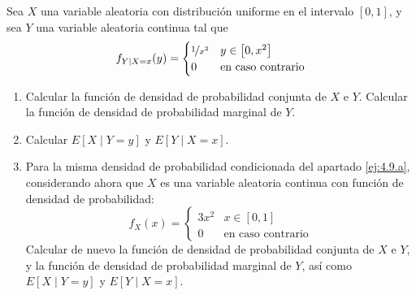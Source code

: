 \begin{ejercicio}
    Sea $X$ una variable aleatoria con distribución uniforme en el intervalo $[0,1]$, y sea $Y$ una variable aleatoria continua tal que
    \begin{equation*}
        f_{Y\mid X=x}(y) = \begin{cases}
            \nicefrac{1}{x^2} & y \in \left[0, x^2\right]\\
            0 & \text{en caso contrario}
        \end{cases}
    \end{equation*}
    \begin{enumerate}
        \item\label{ej:4.9.a} Calcular la función de densidad de probabilidad conjunta de $X$ e $Y$. Calcular la función de densidad de probabilidad marginal de $Y$.
        \item Calcular $E[X\mid Y = y]$ y $E[Y\mid X = x]$.
        \item Para la misma densidad de probabilidad condicionada del apartado \ref{ej:4.9.a}, considerando ahora que $X$ es una variable aleatoria continua con función de densidad de probabilidad:
        \begin{equation*}
            f_X(x) = \begin{cases}
                3x^2 & x \in \left[0,1\right]\\
                0 & \text{en caso contrario}
            \end{cases}
        \end{equation*}
        Calcular de nuevo la función de densidad de probabilidad conjunta de $X$ e $Y$, y la función de densidad de probabilidad marginal de $Y$, así como $E[X\mid Y = y]$ y $E[Y\mid X = x]$.
    \end{enumerate}
\end{ejercicio}

